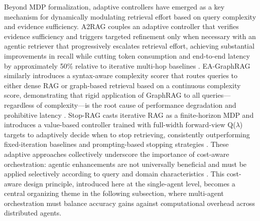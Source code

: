\documentclass[11pt]{article}
\begin{document}
Beyond MDP formalization, adaptive controllers have emerged as a key mechanism for dynamically modulating retrieval effort based on query complexity and evidence sufficiency. A2RAG couples an adaptive controller that verifies evidence sufficiency and triggers targeted refinement only when necessary with an agentic retriever that progressively escalates retrieval effort, achieving substantial improvements in recall while cutting token consumption and end-to-end latency by approximately 50\% relative to iterative multi-hop baselines \cite{ref307}. EA-GraphRAG similarly introduces a syntax-aware complexity scorer that routes queries to either dense RAG or graph-based retrieval based on a continuous complexity score, demonstrating that rigid application of GraphRAG to all queries---regardless of complexity---is the root cause of performance degradation and prohibitive latency \cite{ref300}. Stop-RAG casts iterative RAG as a finite-horizon MDP and introduces a value-based controller trained with full-width forward-view Q(\(\lambda\)) targets to adaptively decide when to stop retrieving, consistently outperforming fixed-iteration baselines and prompting-based stopping strategies \cite{ref308}. These adaptive approaches collectively underscore the importance of cost-aware orchestration: agentic enhancements are not universally beneficial and must be applied selectively according to query and domain characteristics \cite{ref31}. This cost-aware design principle, introduced here at the single-agent level, becomes a central organizing theme in the following subsection, where multi-agent orchestration must balance accuracy gains against computational overhead across distributed agents.
\end{document}
